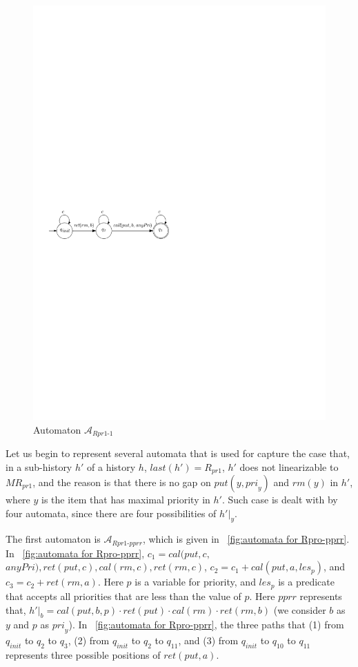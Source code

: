 \documentclass{llncs}
\begin{document}
\begin{figure}[htbp]
  \centering
  \includegraphics[width=0.5 \textwidth]{PIC_AUTO_UNMATCHED_Rpr1-1.pdf}
  \caption{Automaton $\mathcal{A}_{\textit{Rpr1-1}}$}
  \label{fig:automata for Rpro-1}
\end{figure}

Let us begin to represent several automata that is used for capture the case that, in a sub-history $h'$ of a history $h$, $\textit{last}(h')=R_{\textit{pr1}}$, $h'$ does not linearizable to $\textit{MR}_{\textit{pr1}}$, and the reason is that there is no gap on $\textit{put}(y,\textit{pri}_y)$ and $\textit{rm}(y)$ in $h'$, where $y$ is the item that has maximal priority in $h'$. Such case is dealt with by four automata, since there are four possibilities of $h' \vert_{y}$.

The first automaton is $\mathcal{A}_{\textit{Rpr1-pprr}}$, which is given in \figurename~\ref{fig:automata for Rpro-pprr}. In \figurename~\ref{fig:automata for Rpro-pprr}, $c_1= \textit{cal}(\textit{put},c,$ $\textit{anyPri}),\textit{ret}(\textit{put},c), \textit{cal}(\textit{rm},c), \textit{ret}(\textit{rm},c)$, $c_2 = c_1 + \textit{cal}(\textit{put},a,\textit{les}_p)$, and $c_3 = c_2 + \textit{ret}(\textit{rm},a)$. Here $p$ is a variable for priority, and $\textit{les}_p$ is a predicate that accepts all priorities that are less than the value of $p$. Here $\textit{pprr}$ represents that, $h' \vert_{b} = \textit{cal}(\textit{put},b,p) \cdot \textit{ret}(\textit{put}) \cdot \textit{cal}(\textit{rm}) \cdot \textit{ret}(\textit{rm},b)$ (we consider $b$ as $y$ and $p$ as $\textit{pri}_y$). In \figurename~\ref{fig:automata for Rpro-pprr}, the three paths that (1) from $q_{\textit{init}}$ to $q_2$ to $q_3$, (2) from $q_{\textit{init}}$ to $q_2$ to $q_{11}$, and (3) from $q_{\textit{init}}$ to $q_{10}$ to $q_{11}$ represents three possible positions of $\textit{ret}(\textit{put},a)$.
\end{document}
